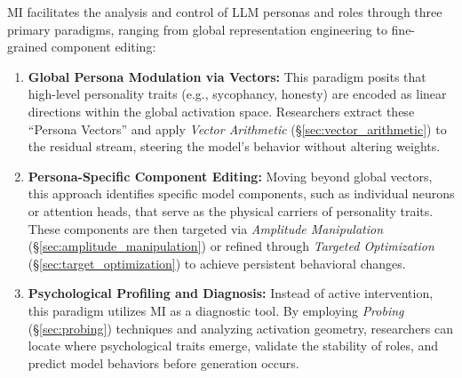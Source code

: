 \documentclass[11pt,letterpaper]{mystyle}
\begin{document}
\begin{tcolorbox}[takeawaysbox, title={Summary of Application Paradigms}]
  MI facilitates the analysis and control of LLM personas and roles through three primary paradigms, ranging from global representation engineering to fine-grained component editing:
  \begin{enumerate}[leftmargin=*, label=\arabic*)]
  \item \textbf{Global Persona Modulation via Vectors:} This paradigm posits that high-level personality traits (e.g., sycophancy, honesty) are encoded as linear directions within the global activation space. Researchers extract these ``Persona Vectors'' and apply \textit{Vector Arithmetic} (\S\ref{sec:vector_arithmetic}) to the residual stream, steering the model's behavior without altering weights.
  \item \textbf{Persona-Specific Component Editing:} Moving beyond global vectors, this approach identifies specific model components, such as individual neurons or attention heads, that serve as the physical carriers of personality traits. These components are then targeted via \textit{Amplitude Manipulation} (\S\ref{sec:amplitude_manipulation}) or refined through \textit{Targeted Optimization} (\S\ref{sec:target_optimization}) to achieve persistent behavioral changes.
  \item \textbf{Psychological Profiling and Diagnosis:} Instead of active intervention, this paradigm utilizes MI as a diagnostic tool. By employing \textit{Probing} (\S\ref{sec:probing}) techniques and analyzing activation geometry, researchers can locate where psychological traits emerge, validate the stability of roles, and predict model behaviors before generation occurs.
  \end{enumerate}
  \end{tcolorbox}
  
\end{document}
